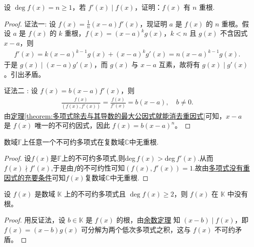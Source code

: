 \documentclass[../../main.tex]{subfiles}%
\begin{document}
\begin{proposition}\label{proposition:f有n重根的判断条件}
设 $\deg f(x) = n \geqslant  1$，若 $f'(x) \mid f(x)$，证明：$f(x)$ 有 $n$ 重根.
\end{proposition}
\begin{proof}

{\color{blue}证法一:}
设 $f(x) = \frac{1}{n}(x - a)f'(x)$，现证明 $a$ 是 $f(x)$ 的 $n$ 重根。假设 $a$ 是 $f(x)$ 的 $k$ 重根，$f(x) = (x - a)^k g(x)$，$k < n$ 且 $g(x)$ 不含因式 $x - a$，则
\begin{align*}
f'(x) = k(x - a)^{k-1}g(x) + (x - a)^k g'(x) = n(x - a)^{k-1}g(x).
\end{align*}
于是 $g(x) \mid (x - a)g'(x)$，而 $g(x)$ 与 $x - a$ 互素，故将有 $g(x) \mid g'(x)$。引出矛盾。

{\color{blue}证法二 :} 设 $f(x) =b(x - a)f'(x)$，则
\begin{align*}
\frac{f(x)}{(f(x), f'(x))} = \frac{f(x)}{f'(x)}  = b(x - a), \quad b \neq 0.
\end{align*}
由\hyperref[theorem:多项式除去与其导数的最大公因式就能消去重因式]{定理\ref{theorem:多项式除去与其导数的最大公因式就能消去重因式}}可知，$x - a$ 是 $f(x)$ 唯一的不可约因式，因此 $f(x) = b(x - a)^n$。

\end{proof}

\begin{proposition}
数域$\mathbb{F}$上任意一个不可约多项式在复数域$\mathbb{C}$中无重根.
\end{proposition}
\begin{proof}

设$f(x)$是$\mathbb{F}$上的不可约多项式,则deg$\,f(x)>$deg$\,f'(x)$.从而$f(x)\nmid f'(x)$,于是由$f$的不可约性可知$(f(x),f'(x))=1$.故由\hyperref[theorem:多项式没有重因式的充要条件]{多项式没有重因式的充要条件}可知$f(x)$复数域$\mathbb{C}$中无重根.

\end{proof}

\begin{lemma}\label{lemma:次数不为1得到不可约多项式没有根}
设 $f(x)$ 是数域 $\mathbb{K}$ 上的不可约多项式且 $\deg f(x) \geqslant  2$，则 $f(x)$ 在 $\mathbb{K}$ 中没有根。
\end{lemma}
\begin{proof}

用反证法，设 $b \in \mathbb{K}$ 是 $f(x)$ 的根，由\hyperref[theorem:余数定理]{余数定理} 知 $(x - b) \mid f(x)$，即 $f(x) = (x - b)g(x)$ 可分解为两个低次多项式之积，这与 $f(x)$ 不可约矛盾。

\end{proof}
\end{document}

